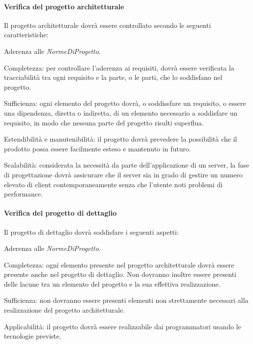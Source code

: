\paragraph{Verifica del progetto architetturale}
Il progetto architetturale dovr\`a essere controllato secondo le seguenti caratteristiche:
\begin{elenconumerato}[\textbf{}]{\subsubsecindent}
\item Aderenza alle \textit{NormeDiProgetto}.
\item Completezza: per controllare l'aderenza ai requisiti, dovr\`a essere verificata la tracciabilit\`a tra ogni requisito e la parte, o le parti, che lo soddisfano nel progetto.
\item Sufficienza: ogni elemento del progetto dovr\`a, o soddissfare un requisito, o essere una dipendenza, diretta o indiretta, di un elemento necessario a soddisfare un requisito, in modo che nessuna parte del progetto risulti superflua.
\item Estendibilit\`a e manutenibilit\`a: il progetto dovr\`a prevedere la possibilit\`a che il prodotto possa essere facilmente esteso e mantenuto in futuro.
\item Scalabilit\`a: considerata la necessit\`a da parte dell'applicazione di un server, la fase di progettazione dovr\`a assicurare che il server sia in grado di gestire un numero elevato di client contemporaneamente senza che l'utente noti problemi di performance.
\end{elenconumerato}
\paragraph{Verifica del progetto di dettaglio}
Il progetto di dettaglio dovr\`a soddisfare i seguenti aspetti:
\begin{elenconumerato}[\textbf{}]{\subsubsecindent}
\item Aderenza alle \textit{NormeDiProgetto}.
\item Completezza: ogni elemento presente nel progetto architetturale dovr\`a essere presente anche nel progetto di dettaglio. Non dovranno inoltre essere presenti delle lacune tra un elemento del progetto e la sua effettiva realizzazione.
\item Sufficienza: non dovranno essere presenti elementi non strettamente necessari alla realizzazione del progetto architetturale.
\item Applicabilit\`a: il progetto dovr\`a essere realizzabile dai programmatori usando le tecnologie previste.
\end{elenconumerato}
